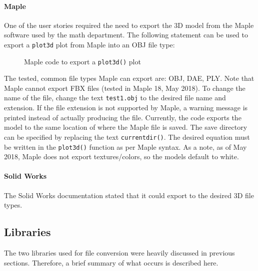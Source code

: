            \paragraph{Maple}

                One of the user stories required the need to export the 3D model from the Maple software used by the math department.  The following statement can be used to export a \texttt{plot3d} plot from Maple into an OBJ file type:

                \noindent\makebox[\linewidth]{\rule{\textwidth}{0.4pt}}

                \begin{figure}[H]
                    
                    \caption{Maple code to export a \texttt{plot3d()} plot}
                \end{figure}

                \noindent\makebox[\linewidth]{\rule{\textwidth}{0.4pt}}                

                The tested, common file types Maple can export are: OBJ, DAE, PLY.  Note that Maple cannot export FBX files (tested in Maple 18, May 2018).  To change the name of the file, change the text \texttt{test1.obj} to the desired file name and extension.  If the file extension is not supported by Maple, a warning message is printed instead of actually producing the file.  Currently, the code exports the model to the same location of where the Maple file is saved.  The save directory can be specified by replacing the text \texttt{currentdir()}.  The desired equation must be written in the \texttt{plot3d()} function as per Maple syntax.  As a note, as of May 2018, Maple does not export textures/colors, so the models default to white.

            \paragraph{Solid Works}
                
            The Solid Works documentation stated that it could export to the desired 3D file types.

    \subsection{Libraries}

        The two libraries used for file conversion were heavily discussed in previous sections.  Therefore, a brief summary of what occurs is described here.

